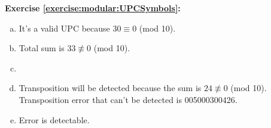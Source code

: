\noindent\textbf{Exercise \ref{exercise:modular:UPCSymbols}:} %
\begin{enumerate}[(a)]
\item
It's a valid UPC because $30 \equiv 0$ (mod 10).
  
\item
Total sum is $33 \not\equiv 0$ (mod 10).

\item%

\item
Transposition will be detected because the sum is $24 \not\equiv 0$ (mod 10).\\
Transposition error that can't be detected is 005000300426.

\item
Error is detectable.


\end{enumerate}
